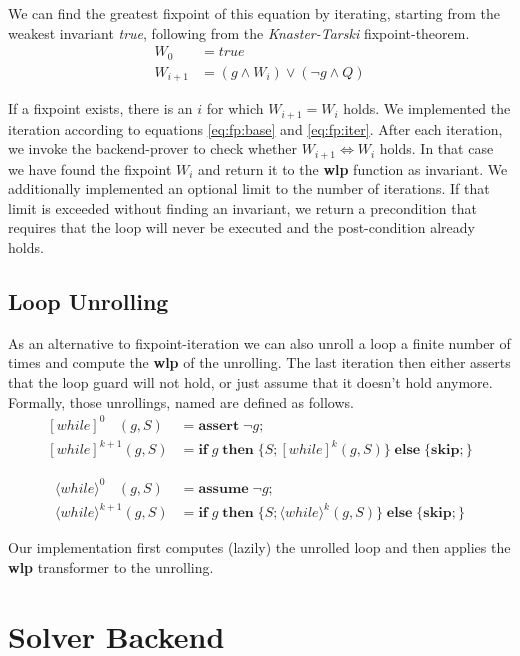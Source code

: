 \documentclass[]{scrartcl}
\newcommand{\IF}[3]{\ensuremath{\mathbf{if}\;#1\;\mathbf{then}\;\{#2\}\;\mathbf{else}\;\{#3\}}}
\newcommand{\SKIP}{\ensuremath{\mathbf{skip};}}
\newcommand{\ASSUME}[1]{\ensuremath{\mathbf{assume}\;#1;}}
\newcommand{\ASSERT}[1]{\ensuremath{\mathbf{assert}\;#1;}}
\newcommand{\UNROLLSQ}[3]{\ensuremath{[\mathit{while}]^{#1}(#2, #3)}}
\newcommand{\UNROLLDI}[3]{\ensuremath{\langle\mathit{while}\rangle^{#1}(#2, #3)}}
\begin{document}
We can find the greatest fixpoint of this equation by iterating, starting from the weakest invariant \emph{true},
following from the \emph{Knaster-Tarski} fixpoint-theorem.
\begin{align}
  \label{eq:fp:base} W_0 &= \mathit{true} \\
  \label{eq:fp:iter} W_{i+1} &= (g \land W_i) \lor (\neg g \land Q)
\end{align}

If a fixpoint exists, there is an $i$ for which $W_{i+1} = W_i$ holds.
We implemented the iteration according to equations \ref{eq:fp:base} and \ref{eq:fp:iter}.
After each iteration, we invoke the backend-prover to check whether $W_{i+1} \iff W_i$ holds.
In that case we have found the fixpoint $W_i$ and return it to the \textbf{wlp} function as
invariant.
We additionally implemented an optional limit to the number of iterations.
If that limit is exceeded without finding an invariant, we return a precondition that requires
that the loop will never be executed and the post-condition already holds.

\subsection{Loop Unrolling}

As an alternative to fixpoint-iteration we can also unroll a loop a finite number of times and
compute the \textbf{wlp} of the unrolling. The last iteration then either asserts that the
loop guard will not hold, or just assume that it doesn't hold anymore.
Formally, those unrollings, named  are defined as follows.
\begin{align}
\UNROLLSQ{0\phantom{+1}}{g}{S} &= \ASSERT{\neg g} \\
\UNROLLSQ{k+1}{g}{S} &= \IF{g}{S; \UNROLLSQ{k}{g}{S}}{\SKIP}
\end{align}

\begin{align}
\UNROLLDI{0\phantom{+1}}{g}{S} &= \ASSUME{\neg g} \\
\UNROLLDI{k+1}{g}{S} &= \IF{g}{S; \UNROLLDI{k}{g}{S}}{\SKIP}
\end{align}

Our implementation first computes (lazily) the unrolled loop and then applies
the \textbf{wlp} transformer to the unrolling.

\section{Solver Backend}
\end{document}
